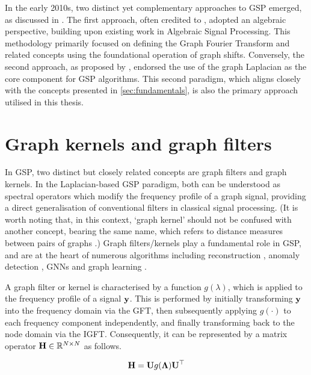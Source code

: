 In the early 2010s, two distinct yet complementary approaches to GSP emerged, as discussed in \cite{Leus2023}. The first approach, often credited to \cite{Sandryhaila2013, Sandryhaila2013b}, adopted an algebraic perspective, building upon existing work in Algebraic Signal Processing. This methodology primarily focused on defining the Graph Fourier Transform and related concepts using the foundational operation of graph shifts. Conversely, the second approach, as proposed by  \cite{Hammond2011, Shuman2013}, endorsed the use of the graph Laplacian as the core component for GSP algorithms. This second paradigm, which aligns closely with the concepts presented in \cref{sec:fundamentals}, is also the primary approach utilised in this thesis.


\section{Graph kernels and graph filters}

\label{sec:graph_kernels}

In GSP, two distinct but closely related concepts are graph filters and graph kernels. In the Laplacian-based GSP paradigm, both can be understood as spectral operators which modify the frequency profile of a graph signal, providing a direct generalisation of conventional filters in classical signal processing. (It is worth noting that, in this context, `graph kernel' should not be confused with another concept, bearing the same name, which refers to distance measures between pairs of graphs \citep{Kriege2020}.) Graph filters/kernels play a fundamental role in GSP, and are at the heart of numerous algorithms including reconstruction \citep{Romero2017b}, anomaly detection \citep{Xiao2021}, GNNs \citep{Gama2020} and graph learning \citep{Mateos2019}. 

A graph filter or kernel is characterised by a function $g(\lambda)$, which is applied to the frequency profile of a signal $\mathbf{y}$. This is performed by initially transforming $\mathbf{y}$ into the frequency domain via the GFT, then subsequently applying $g(\cdot)$ to each frequency component independently, and finally transforming back to the node domain via the IGFT. Consequently, it can be represented by a matrix operator $\mathbf{H} \in \mathbb{R}^{N \times N}$ as follows.

\begin{equation}
    \mathbf{H}  = \mathbf{U} g(\mathbf{\Lambda}) \mathbf{U}^\top 
\end{equation}

